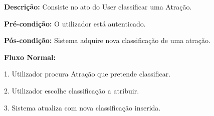 \textbf{Descrição:} Consiste no ato do User classificar uma Atração.

\textbf{Pré-condição:} O utilizador está autenticado.

\textbf{Pós-condição:} Sistema adquire nova classificação de uma atração.

\textbf{Fluxo Normal:}

1. Utilizador procura Atração que pretende classificar.

2. Utilizador escolhe classificação a atribuir.

3. Sistema atualiza com nova classificação inserida.